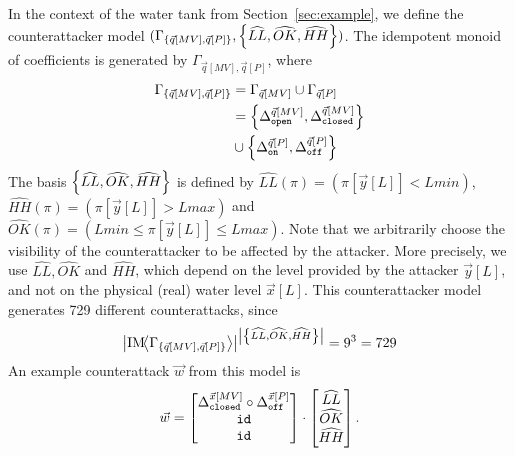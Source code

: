 {\begin{example}
  \label{ex:counterattack}
  In the context of the water tank from Section~\ref{sec:example}, we define the counterattacker model $(\Gamma_{\left\{\vec{q}[MV],\vec{q}[P]\right\}},\left\{\widehat{LL},\widehat{OK},\widehat{HH}\right\})$. The idempotent monoid of coefficients is generated by $\Gamma_{\vec{q}[MV],\vec{q}[P]}$, where 
  \begin{align*}
    \Gamma_{\left\{\vec{q}[MV],\vec{q}[P]\right\}}&=\Gamma_{\vec{q}[MV]}\cup\Gamma_{\vec{q}[P]}\\
    &=\left\{{\Delta}^{\vec{q}[MV]}_{\texttt{open}},{\Delta}^{\vec{q}[MV]}_{\texttt{closed}}\right\}\\
    &\cup \left\{{\Delta}^{\vec{q}[P]}_{\texttt{on}},{\Delta}^{\vec{q}[P]}_{\texttt{off}}\right\}
  \end{align*}
  The basis $\left\{\widehat{LL},\widehat{OK},\widehat{HH}\right\}$ is defined by  $\widehat{LL}(\pi)=(\pi[\vec{y}[L]]<Lmin)$, $\widehat{HH}(\pi)=(\pi[\vec{y}[L]]>Lmax)$ and $\widehat{OK}(\pi)=(Lmin\leq \pi[\vec{y}[L]]\leq Lmax)$. Note that we arbitrarily choose the visibility of the counterattacker to be affected by the attacker. More precisely, we use $\widehat{LL},\widehat{OK}$ and $\widehat{HH}$, which depend on the level provided by the attacker $\vec{y}[L]$, and not on the physical (real) water level $\vec{x}[L]$. 
  This counterattacker model generates 729 different counterattacks, 
since
\begin{align*}
  \left| \text{IM}\!{{\left<\Gamma_{\left\{\vec{q}[MV],\vec{q}[P]\right\}}\right>}}\right|^{\left|\left\{\widehat{LL},\widehat{OK},\widehat{HH}\right\}\right|}=9^3=729
\end{align*}
  An example counterattack $\vec{w}$ from this model is 
  \begin{align}
    \vec{w}=
    \begin{bmatrix}
      {\Delta}^{\vec{x}[MV]}_{\texttt{closed}} \circ {\Delta}^{\vec{x}[P]}_{\texttt{off}} \\
      {\texttt{id}} \\
      {\texttt{id}}
    \end{bmatrix}
    \cdot
    \begin{bmatrix}
      \widehat{LL} \\
      \widehat{OK}\\
      \widehat{HH}
    \end{bmatrix}.
  \end{align}
\end{example}

}
